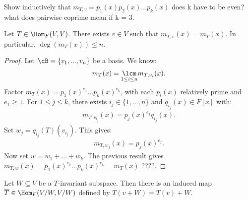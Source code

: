     \begin{exercise}
        Show inductively that $m_{T,v} = p_1(x)p_2(x)...p_k(x)$ {\color{red} does k have to be even? what does pairwise coprime mean if k = 3}.
    \end{exercise}

    \begin{theorem}
        Let $T \in \Hom_F(V,V)$. There exists $v \in V$ such that $m_{T,v}(x) = m_T(x)$. In particular, $\deg(m_T(x)) \leq n$.
    \end{theorem}
        \begin{proof}
            Let $\cB = \{v_1,...,v_n\}$ be a basis. We know:
            \begin{equation*}
                \begin{split}
                    m_T(x) = \underset{1 \leq i \leq n}\lcm m_{T,v_i}(x).
                \end{split}
                \end{equation*}
            Factor $m_T(x) = p_1(x)^{e_1}...p_k(x)^{e_k}$, with each $p_i(x)$ relatively prime and $e_1 \geq 1$. For $1 \leq j \leq k$, there exists $i_j \in \{1,...,n\}$ and $q_{i_j}(x) \in F[x]$ with:
                \begin{equation*}
                \begin{split}
                    m_{T,v_{i_j}}(x) = p_j(x)^{e_j}q_{i_j}(x).
                \end{split}
                \end{equation*}
            Set $w_j = q_{i_j}(T)(v_{i_j})$. This gives:
                \begin{equation*}
                \begin{split}
                    m_{T,w_j}(x) = p_j(x)^{e_j}.
                \end{split}
                \end{equation*}
            Now set $w = w_1 + ... + w_k$. The previous result gives $m_{T,w}(x) = p_1(x)^{e_1}...p_k(x)^{e_k} = m_T(x)${\color{red} ????}.
        \end{proof}
    
    \begin{lemma}
        Let $W \subseteq V$ be a $T$-invariant subspace. Then there is an induced map $\overline{T} \in \Hom_F(V/W,V/W)$ defined by $\overline{T}(v+W) = T(v)+W$.
    \end{lemma}

